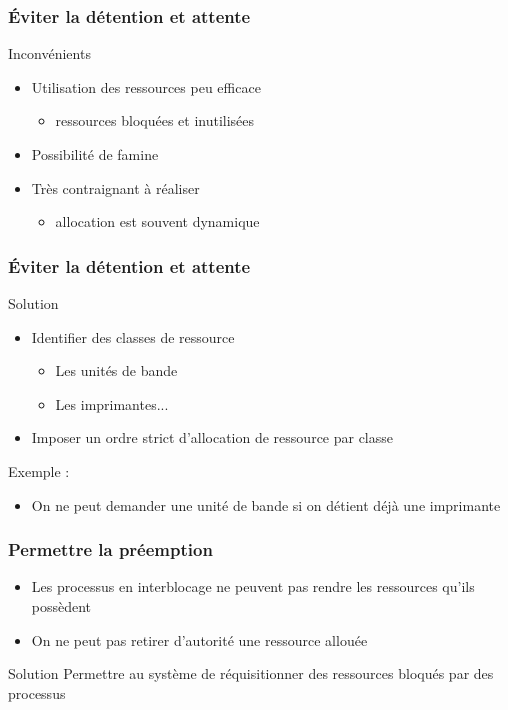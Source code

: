 \begin{frame}
\frametitle{Éviter la détention et attente}
\begin{block}{Inconvénients}
\begin{itemize}
\item Utilisation des ressources peu efficace
\begin{itemize}
\item ressources bloquées et inutilisées
\end{itemize}
\item Possibilité de famine
\item Très contraignant à réaliser
\begin{itemize}
\item allocation est souvent dynamique
\end{itemize}
\end{itemize}
\end{block}
\end{frame}

\begin{frame}
\frametitle{Éviter la détention et attente}
\begin{block}{Solution}
\begin{itemize}
\item Identifier des classes de ressource
\begin{itemize}
\item Les unités de bande
\item Les imprimantes...
\end{itemize}
\item Imposer un ordre strict d’allocation de ressource par classe
\end{itemize}
\end{block}

Exemple :
\begin{itemize}
\item On ne peut demander une unité de bande si on détient déjà une imprimante
\end{itemize}
\end{frame}

\begin{frame}
\frametitle{Permettre la préemption}
\begin{itemize}
\item Les processus en interblocage ne peuvent pas rendre les ressources qu’ils possèdent
\item On ne peut pas retirer d'autorité une ressource allouée
\end{itemize}
\begin{block}{Solution}
Permettre au système de réquisitionner des ressources bloqués par des processus
\end{block}
\end{frame}

